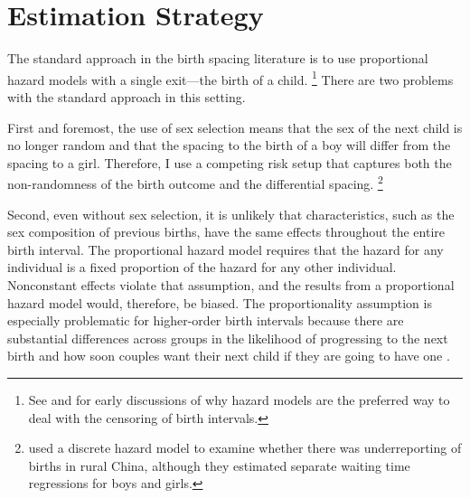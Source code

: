 \documentclass[12pt,letterpaper]{article}
\begin{document}

\section{Estimation Strategy\label{sec:strategy}}


The standard approach in the birth spacing literature is to use proportional hazard
models with a single exit---the birth of a child.%
\footnote{
See \citet{Sheps1970} and \citet{Newman1984} for early discussions of why 
hazard models are the preferred way to deal with the censoring of birth
intervals.
}
There are two problems with the standard approach in this setting.

First and foremost, the use of sex selection means that the sex of the next child is 
no longer random and that the spacing to the birth of a boy will differ from the 
spacing to a girl. 
Therefore, I use a competing risk setup that captures both the non-randomness of 
the birth outcome and the differential spacing.%
\footnote{
\cite{Merli2000} used a discrete hazard model to examine whether 
there was underreporting of births in rural China, although they 
estimated separate waiting time regressions for boys and girls.
}

Second, even without sex selection, it is unlikely that characteristics, such as 
the sex composition of previous births, have the same effects throughout the entire 
birth interval. 
The proportional hazard model requires that the hazard for any individual is a 
fixed proportion of the hazard for any other individual. 
Nonconstant effects violate that assumption, and the results from a proportional hazard 
model would, therefore, be biased. 
The proportionality assumption is especially problematic for higher-order birth 
intervals because there are substantial differences across groups in the likelihood 
of progressing to the next birth and how soon couples want their next child if they 
are going to have one \citep{Whitworth2002,Bhalotra2008,Kim2010}.
\end{document}
